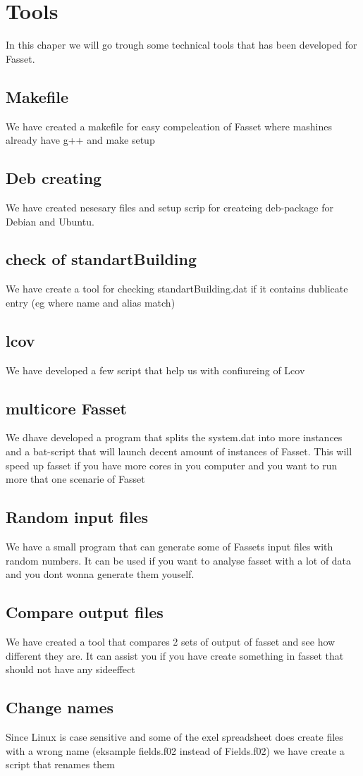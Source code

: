 \chapter{Tools}
In this chaper we will go trough some technical tools that has been developed for Fasset.
\section{Makefile}
We have created a makefile for easy compeleation of Fasset where mashines already have g++ and make setup
\section{Deb creating}
We have created nesesary files and setup scrip for createing deb-package for Debian and Ubuntu.
\section{check of standartBuilding}
We have create a tool for checking standartBuilding.dat if it contains dublicate entry (eg where name and alias match)
\section{lcov}
We have developed a few script that help us with confiureing of Lcov
\section{multicore Fasset}
We dhave developed a program that splits the system.dat into more instances and a bat-script that will launch decent amount of instances of Fasset. This will speed up fasset if you have more cores in you computer and you want to run more that one scenarie of Fasset
\section{Random input files}
We have a small program that can generate some of Fassets input files with random numbers. It can be used if you want to analyse fasset with a lot of data and you dont  wonna generate them youself.
\section{Compare output files}
We have created a tool that compares 2 sets of output of fasset and see how different they are. It can assist you if you have create something in fasset that should not have any sideeffect
\section{Change names}
Since Linux is case sensitive and some of the exel spreadsheet does create files with a wrong name (eksample fields.f02 instead of Fields.f02) we have create a script that renames them